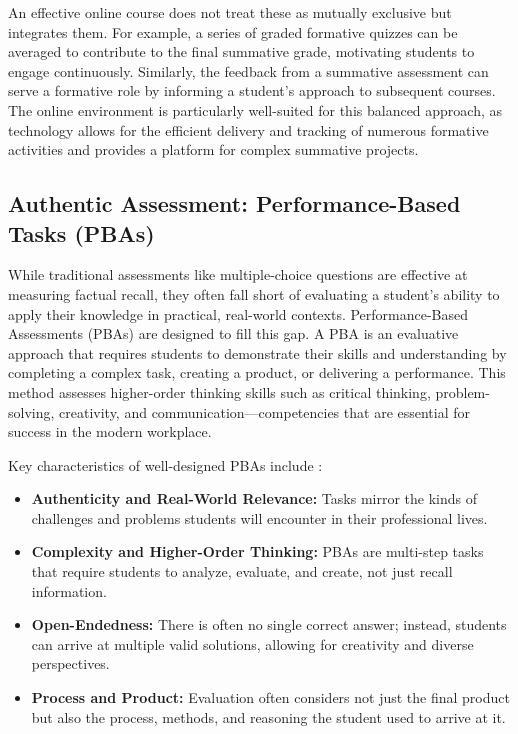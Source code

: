 \documentclass{article}
\begin{document}
An effective online course does not treat these as mutually exclusive but integrates them. For example, a series of graded formative quizzes can be averaged to contribute to the final summative grade, motivating students to engage continuously.\cite{95} Similarly, the feedback from a summative assessment can serve a formative role by informing a student's approach to subsequent courses.\cite{91} The online environment is particularly well-suited for this balanced approach, as technology allows for the efficient delivery and tracking of numerous formative activities and provides a platform for complex summative projects.\cite{91, 93}

\subsection{Authentic Assessment: Performance-Based Tasks (PBAs)}

While traditional assessments like multiple-choice questions are effective at measuring factual recall, they often fall short of evaluating a student's ability to apply their knowledge in practical, real-world contexts. Performance-Based Assessments (PBAs) are designed to fill this gap.\cite{96} A PBA is an evaluative approach that requires students to demonstrate their skills and understanding by completing a complex task, creating a product, or delivering a performance.\cite{96, 97, 98} This method assesses higher-order thinking skills such as critical thinking, problem-solving, creativity, and communication—competencies that are essential for success in the modern workplace.\cite{96, 97, 99}

Key characteristics of well-designed PBAs include \cite{98, 100, 101}:
\begin{itemize}
    \item \textbf{Authenticity and Real-World Relevance:} Tasks mirror the kinds of challenges and problems students will encounter in their professional lives.\cite{97, 100}
    \item \textbf{Complexity and Higher-Order Thinking:} PBAs are multi-step tasks that require students to analyze, evaluate, and create, not just recall information.\cite{98, 100}
    \item \textbf{Open-Endedness:} There is often no single correct answer; instead, students can arrive at multiple valid solutions, allowing for creativity and diverse perspectives.\cite{96, 98}
    \item \textbf{Process and Product:} Evaluation often considers not just the final product but also the process, methods, and reasoning the student used to arrive at it.\cite{97, 98}
\end{itemize}
\end{document}
